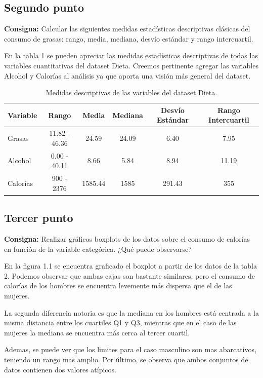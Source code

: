 \documentclass{article} %
\begin{document}
\subsection{Segundo punto}

\textbf{Consigna:} Calcular las siguientes medidas estadísticas descriptivas clásicas del consumo de grasas: rango, media, mediana, desvío estándar y rango intercuartil.

En la tabla 1 se pueden apreciar las medidas estadísticas descriptivas de todas las variables cuantitativas del dataset Dieta. Creemos pertinente agregar las variables Alcohol y Calorías al análisis ya que aporta una visión más general del dataset.

\begin{table}[H]
	\centering
		\begin{tabular}{||l || c | c | c | c | c ||}
			\hline
			\hline
			Variable & Rango & Media & Mediana & Desvío Estándar & Rango Intercuartil\\
			\hline			
			\hline
			Grasas & 11.82 - 46.36 & 24.59 & 24.09 & 6.40 & 7.95\\
			\hline
			Alcohol & 0.00 - 40.11 & 8.66 & 5.84 & 8.94 & 11.19\\
			\hline
			Calorías & 900 - 2376 & 1585.44 & 1585 & 291.43 & 355\\
			\hline
			\hline
		\end{tabular}
		\caption{Medidas descriptivas de las variables del dataset Dieta.}
	\label{tab:table-punto-1-2}
\end{table}

\subsection{Tercer punto}

\textbf{Consigna:} Realizar gráficos boxplots de los datos sobre el consumo de calorías en función de la variable categórica. ¿Qué puede observarse?

En la figura 1.1 se encuentra graficado el boxplot a partir de los datos de la tabla 2. Podemos observar que ambas cajas son bastante similares, pero el consumo de calorías de los hombres se encuentra levemente más dispersa que el de las mujeres. 

La segunda diferencia notoria es que la mediana en los hombres está centrada a la misma distancia entre los cuartiles Q1 y Q3, mientras que en el caso de las mujeres la mediana se encuentra más cerca al tercer cuartil.

Ademas, se puede ver que los limites para el caso masculino son mas abarcativos, teniendo un rango mas amplio. Por último, se observa que ambos conjuntos de datos contienen dos valores atípicos. 
\end{document}
